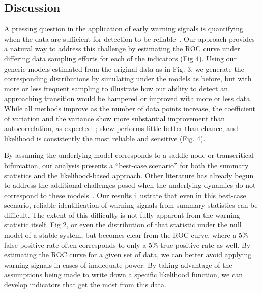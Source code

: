 \documentclass{pnastwo}
\begin{document}
\begin{article}

\section{Discussion}
A pressing question in the application of early warning signals is quantifying
when the data are sufficient for detection to be reliable~\cite{Scheffer2009, Scheffer2010, Inman2011}. 
Our approach provides a natural way to address this challenge by estimating the ROC curve under differing data sampling efforts
for each of the indicators (Fig 4). 
Using our generic models estimated from the original data as in Fig. 3, 
we generate the corresponding distributions by simulating under the models as before, 
but with more or less frequent sampling to illustrate how our ability to detect an approaching transition 
would be hampered or improved with more or less data.  
While all methods improve as the number of data points increase, 
the coefficient of variation and the variance show more substantial improvement than autocorrelation, 
as expected~\cite{Carpenter2011};⁠
skew performs little better than chance, and likelihood is consistently the most reliable and sensitive (Fig. 4). 


By assuming the underlying model corresponds to a saddle-node or transcritical bifurcation,
our analysis presents a ``best-case scenario'' for both the summary statistics and the likelihood-based approach. 
Other literature has already begun to address the additional challenges posed when the underlying 
dynamics do not correspond to these models~\cite{Hastings2010}.
Our results illustrate that even in this best-case scenario, 
reliable identification of warning signals from summary statistics can be difficult.  
The extent of this difficulty is not fully apparent from the warning statistic itself, Fig 2,
or even the distribution of that statistic under the null model of a stable system, 
but becomes clear from the ROC curve, where a 5\% false positive rate often corresponds to only a 5\% true positive rate as well.  
By estimating the ROC curve for a given set of data, 
we can better avoid applying warning signals in cases of inadequate power.
By taking advantage of the assumptions being made to write down a specific likelihood function,
we can develop indicators that get the most from this data.  



\end{article}
\end{document}
